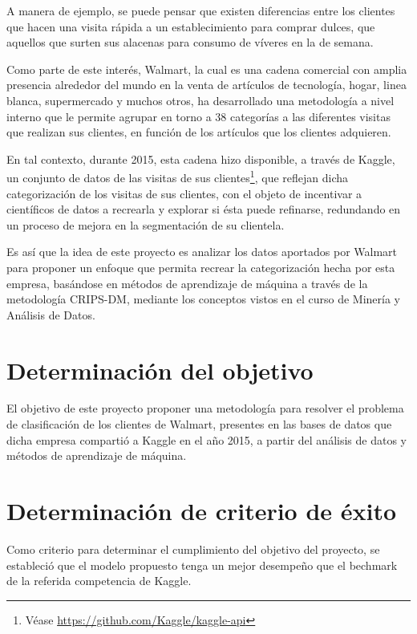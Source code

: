 \documentclass[]{book}
\let\rmarkdownfootnote\footnote%
\def\footnote{\protect\rmarkdownfootnote}
\begin{document}
A manera de ejemplo, se puede pensar que existen diferencias entre los clientes que hacen una visita rápida a un establecimiento para comprar dulces, que aquellos que surten sus alacenas para consumo de víveres en la de semana.

Como parte de este interés, Walmart, la cual es una cadena comercial con amplia presencia alrededor del mundo en la venta de artículos de tecnología, hogar, linea blanca, supermercado y muchos otros, ha desarrollado una metodología a nivel interno que le permite agrupar en torno a 38 categorías a las diferentes visitas que realizan sus clientes, en función de los artículos que los clientes adquieren.

En tal contexto, durante 2015, esta cadena hizo disponible, a través de Kaggle, un conjunto de datos de las visitas de sus clientes\footnote{Véase \url{https://github.com/Kaggle/kaggle-api}}, que reflejan dicha categorización de los visitas de sus clientes, con el objeto de incentivar a científicos de datos a recrearla y explorar si ésta puede refinarse, redundando en un proceso de mejora en la segmentación de su clientela.

Es así que la idea de este proyecto es analizar los datos aportados por Walmart para proponer un enfoque que permita recrear la categorización hecha por esta empresa, basándose en métodos de aprendizaje de máquina a través de la metodología CRIPS-DM, mediante los conceptos vistos en el curso de Minería y Análisis de Datos.

\hypertarget{determinaciuxf3n-del-objetivo}{%
\section{Determinación del objetivo}\label{determinaciuxf3n-del-objetivo}}

El objetivo de este proyecto proponer una metodología para resolver el problema de clasificación de los clientes de Walmart, presentes en las bases de datos que dicha empresa compartió a Kaggle en el año 2015, a partir del análisis de datos y métodos de aprendizaje de máquina.

\hypertarget{determinaciuxf3n-de-criterio-de-uxe9xito}{%
\section{Determinación de criterio de éxito}\label{determinaciuxf3n-de-criterio-de-uxe9xito}}

Como criterio para determinar el cumplimiento del objetivo del proyecto, se estableció que el modelo propuesto tenga un mejor desempeño que el bechmark de la referida competencia de Kaggle.
\end{document}
